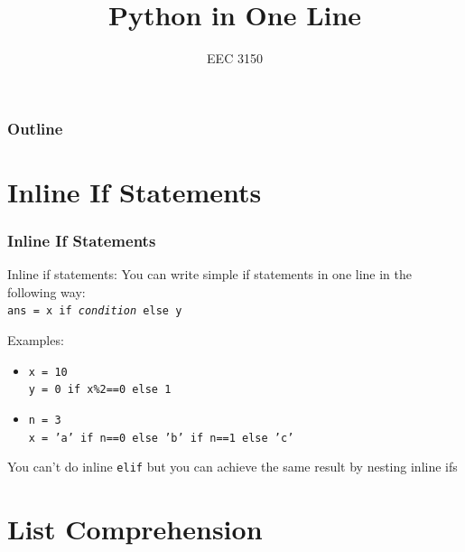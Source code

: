 \documentclass{beamer}
\title{Python in One Line}
\author{EEC 3150}
\date{}
\institute{Trevecca Nazarene University}
\newcommand{\code}[1]{\texttt{#1}}
\begin{document}
\frame{\titlepage}
 
\begin{frame}	
	\frametitle{Outline}
	\tableofcontents	
\end{frame}


\section{Inline If Statements}

\begin{frame}	
\end{frame}

\begin{frame}	
	\frametitle{Inline If Statements}
	
	\begin{block}{Inline if statements:}	
		You can write simple if statements in one line in the following way: \\[2pt]
		\code{ans = x if \emph{condition} else y}
		
		\vspace{10pt}
		Examples:
		\begin{itemize}
			\item \code{x = 10\\
				y = 0 if x\%2==0 else 1
		}
			\item \code{n = 3 \\
				x = 'a' if n==0 else 'b' if n==1 else 'c'
		}
		\end{itemize}
		\vspace{10pt}
		You can't do inline \code{elif} but you can achieve the same result by nesting inline ifs
	\end{block}
	
\end{frame}


\section{List Comprehension}

\begin{frame}	
\end{frame}
\end{document}
